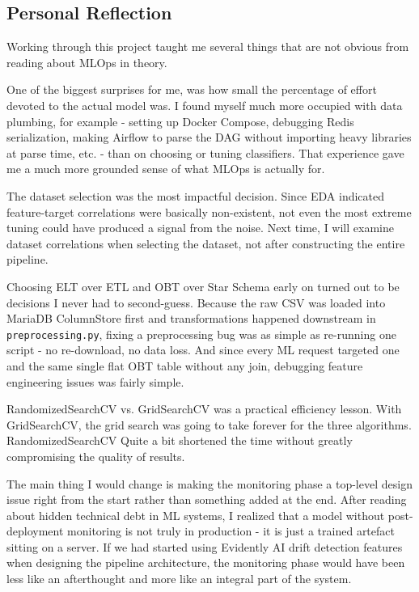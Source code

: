 \documentclass[12pt,a4paper]{article}
\begin{document}
\subsection{Personal Reflection}

Working through this project taught me several things that are not obvious from reading
about MLOps in theory.

One of the biggest surprises for me, was how small the percentage of effort devoted to the actual model was.
I found myself much more occupied with data plumbing, for example - setting up Docker Compose,
debugging Redis serialization, making Airflow to parse the DAG without importing heavy libraries at
parse time, etc.
- than on choosing or tuning classifiers. 
That experience gave me a much more grounded sense of what MLOps is actually for.

The dataset selection was the most impactful decision. Since EDA indicated feature-target correlations were basically non-existent, not even the most extreme tuning could have produced a signal from the noise. Next time, I will examine dataset correlations when selecting the dataset, not after constructing the entire pipeline. 

Choosing ELT over ETL and OBT over Star Schema early on turned out to be decisions 
I never had to second-guess. Because the raw CSV was loaded into MariaDB ColumnStore 
first and transformations happened downstream in \texttt{preprocessing.py}, fixing a 
preprocessing bug was as simple as re-running one script - no re-download, no data 
loss. And since every ML request targeted one and the same single flat OBT table without any join, debugging feature engineering issues was fairly simple. 

RandomizedSearchCV vs. GridSearchCV was a practical efficiency lesson.
With GridSearchCV, the grid search was going to take forever for the three algorithms. RandomizedSearchCV Quite a bit shortened the time without greatly compromising the quality of results. 

The main thing I would change is making the monitoring phase a top-level design issue right from the start rather than something added at the end. After reading about hidden technical debt in ML systems, \cite{sculley2015} I realized that a model without post-deployment monitoring is not truly in production - it is just a trained artefact sitting on a server. If we had started using Evidently AI drift detection features when designing the pipeline architecture, the monitoring phase would have been less like an afterthought and more like an integral part of the system. 
\end{document}
